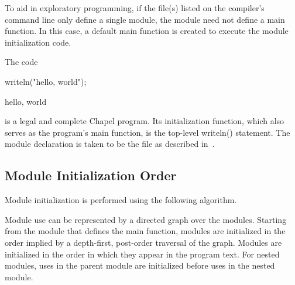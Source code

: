 

To aid in exploratory programming, if the file(s) listed on the
compiler's command line only define a single module, the module need
not define a main function.  In this case, a default main function is
created to execute the module initialization code.
\begin{example}
The code
\begin{chapelpre}
\end{chapelpre}
\begin{chapel}
writeln("hello, world");
\end{chapel}
\begin{chapeloutput}
hello, world
\end{chapeloutput}
is a legal and complete Chapel program.  Its initialization function,
which also serves as the program's main function, is the top-level
writeln() statement.  The module declaration is taken to be the file
as described in~.
\end{example}


\subsection{Module Initialization Order}
\label{Module_Initialization_Order}

Module initialization is performed using the following algorithm.

Module use can be represented by a directed graph over the modules.
Starting from the module that defines the main function, modules are
initialized in the order implied by a depth-first, post-order
traversal of the graph.  Modules are initialized in the order in which
they appear in the program text.  For nested modules, uses in the
parent module are initialized before uses in the nested module.

